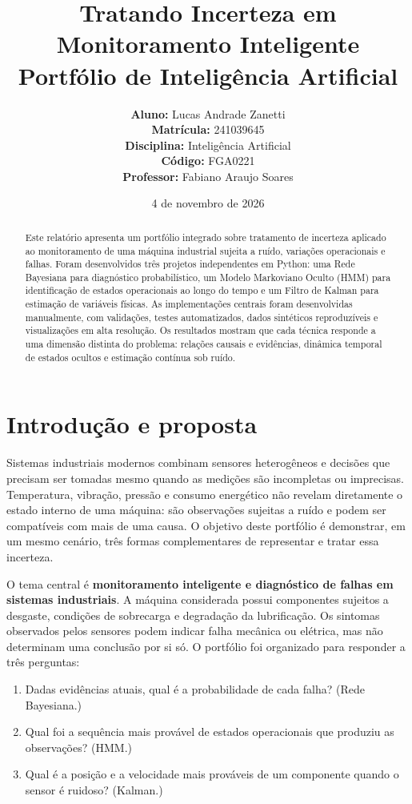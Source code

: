 \documentclass[11pt,a4paper]{article}
\title{\textbf{Tratando Incerteza em Monitoramento Inteligente}\\
\large Portfólio de Inteligência Artificial}
\author{
\textbf{Aluno:} Lucas Andrade Zanetti\\
\textbf{Matrícula:} 241039645\\
\textbf{Disciplina:} Inteligência Artificial\\
\textbf{Código:} FGA0221\\
\textbf{Professor:} Fabiano Araujo Soares
}
\date{4 de novembro de 2026}
\begin{document}
\maketitle
\thispagestyle{empty}
\begin{abstract}
Este relatório apresenta um portfólio integrado sobre tratamento de incerteza aplicado ao monitoramento de uma máquina industrial sujeita a ruído, variações operacionais e falhas. Foram desenvolvidos três projetos independentes em Python: uma Rede Bayesiana para diagnóstico probabilístico, um Modelo Markoviano Oculto (HMM) para identificação de estados operacionais ao longo do tempo e um Filtro de Kalman para estimação de variáveis físicas. As implementações centrais foram desenvolvidas manualmente, com validações, testes automatizados, dados sintéticos reproduzíveis e visualizações em alta resolução. Os resultados mostram que cada técnica responde a uma dimensão distinta do problema: relações causais e evidências, dinâmica temporal de estados ocultos e estimação contínua sob ruído.
\end{abstract}
\tableofcontents
\newpage

\section{Introdução e proposta}
Sistemas industriais modernos combinam sensores heterogêneos e decisões que precisam ser tomadas mesmo quando as medições são incompletas ou imprecisas. Temperatura, vibração, pressão e consumo energético não revelam diretamente o estado interno de uma máquina: são observações sujeitas a ruído e podem ser compatíveis com mais de uma causa. O objetivo deste portfólio é demonstrar, em um mesmo cenário, três formas complementares de representar e tratar essa incerteza.

O tema central é \textbf{monitoramento inteligente e diagnóstico de falhas em sistemas industriais}. A máquina considerada possui componentes sujeitos a desgaste, condições de sobrecarga e degradação da lubrificação. Os sintomas observados pelos sensores podem indicar falha mecânica ou elétrica, mas não determinam uma conclusão por si só. O portfólio foi organizado para responder a três perguntas:
\begin{enumerate}
\item Dadas evidências atuais, qual é a probabilidade de cada falha? (Rede Bayesiana.)
\item Qual foi a sequência mais provável de estados operacionais que produziu as observações? (HMM.)
\item Qual é a posição e a velocidade mais prováveis de um componente quando o sensor é ruidoso? (Kalman.)
\end{enumerate}
\end{document}
